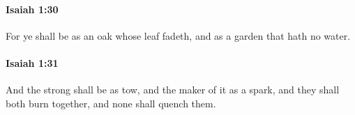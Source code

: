 		\paragraph{Isaiah 1:30} %
			\label{ISAIAH-1-30}

			For ye shall be as an oak whose leaf fadeth, and as a garden that hath no water.


		\paragraph{Isaiah 1:31} %
			\label{ISAIAH-1-31}

			And the strong shall be as tow, and the maker of it as a spark, and they shall both burn together, and none shall quench them.

